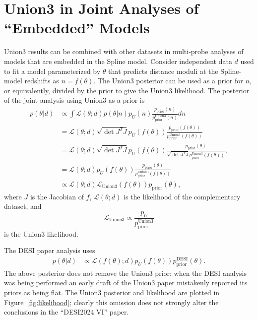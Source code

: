 \documentclass[11pt,a4paper]{article}
\begin{document}
\section{Union3 in Joint Analyses of ``Embedded'' Models}
\label{sec:joint}
Union3 results can be combined with other datasets in multi-probe analyses of models that are embedded in the Spline model.
Consider independent data $d$ used to fit a model parameterized by $\theta$
that predicts distance moduli at the Spline-model redshifts as $n=f(\theta)$.
The Union3 posterior can be used as a prior for $n$, or equivalently, divided by the prior to
give the Union3 likelihood.  The posterior of the joint analysis using Union3 as a prior is
\begin{align}
p(\theta|d) &\propto \int  \mathcal{L}(\theta; d)p(\theta|n)p_U(n) \frac{p_\text{prior}(n)}{p^\text{Union3}_\text{prior}(n)}dn\\
&=  \mathcal{L}(\theta; d)    {\sqrt{\det{J^TJ}}}   {p_U(f(\theta))}  \frac{p_\text{prior}(f(\theta))}{p^\text{Union3}_\text{prior}(f(\theta))}\\
&=  \mathcal{L}(\theta; d)  {\sqrt{\det{J^TJ}}}  {p_U(f(\theta))}  \frac{p_\text{prior}(\theta)}{  {\sqrt{\det{J^TJ}}}  p^\text{Union3}_\text{prior}(f(\theta))}, \label{eq:correct} \\
&=  \mathcal{L}(\theta; d) {p_U(f(\theta))}  \frac{p_\text{prior}(\theta)}{ p^\text{Union3}_\text{prior}(f(\theta))} \\
&\propto  \mathcal{L}(\theta; d) \mathcal{L}_\text{Union3}(f(\theta)) {p_\text{prior}(\theta)}, \label{eq:correct}
\end{align}
 where  $J$ is the Jacobian of $f$,
$\mathcal{L}(\theta; d)$ is the likelihood of the complementary dataset, and
\begin{equation}
\mathcal{L}_\text{Union3} \propto \frac{p_U}{ p^\text{Union3}_\text{prior}}
 \end{equation}
is the Union3 likelihood.

The DESI paper analysis uses
\begin{align}
p(\theta | d) & \propto  \mathcal{L}(f(\theta);d) {p_U(f(\theta))}  p^\text{DESI}_\text{prior}(\theta) \label{eq:DESI}.
\end{align}
The above posterior does not remove the Union3 prior: when the DESI analysis
was being performed an early draft of the Union3 paper mistakenly reported its priors as being flat.    The Union3 posterior and likelihood are plotted
in Figure~\ref{fig:likelihood}; clearly this omission does not strongly alter the conclusions in the ``DESI2024 VI''
paper. 
\end{document}
